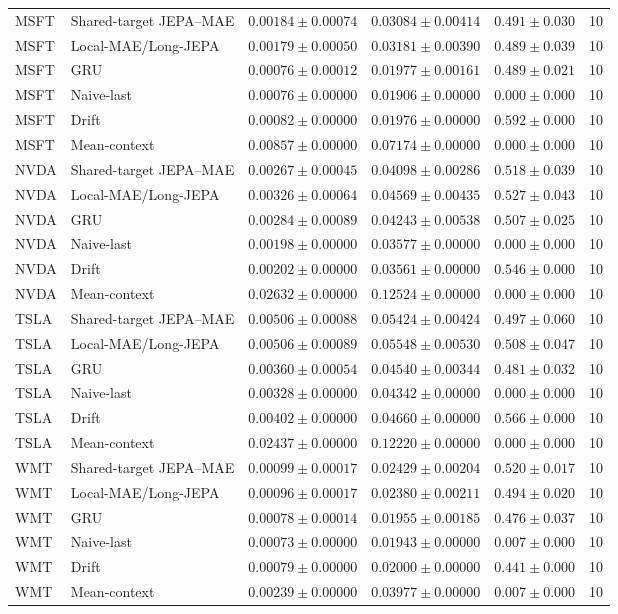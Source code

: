 \begin{longtable}{llrrrr}
MSFT & Shared-target JEPA--MAE & $0.00184 \pm 0.00074$ & $0.03084 \pm 0.00414$ & $0.491 \pm 0.030$ & 10 \\
MSFT & Local-MAE/Long-JEPA & $0.00179 \pm 0.00050$ & $0.03181 \pm 0.00390$ & $0.489 \pm 0.039$ & 10 \\
MSFT & GRU & $0.00076 \pm 0.00012$ & $0.01977 \pm 0.00161$ & $0.489 \pm 0.021$ & 10 \\
MSFT & Naive-last & $0.00076 \pm 0.00000$ & $0.01906 \pm 0.00000$ & $0.000 \pm 0.000$ & 10 \\
MSFT & Drift & $0.00082 \pm 0.00000$ & $0.01976 \pm 0.00000$ & $0.592 \pm 0.000$ & 10 \\
MSFT & Mean-context & $0.00857 \pm 0.00000$ & $0.07174 \pm 0.00000$ & $0.000 \pm 0.000$ & 10 \\
NVDA & Shared-target JEPA--MAE & $0.00267 \pm 0.00045$ & $0.04098 \pm 0.00286$ & $0.518 \pm 0.039$ & 10 \\
NVDA & Local-MAE/Long-JEPA & $0.00326 \pm 0.00064$ & $0.04569 \pm 0.00435$ & $0.527 \pm 0.043$ & 10 \\
NVDA & GRU & $0.00284 \pm 0.00089$ & $0.04243 \pm 0.00538$ & $0.507 \pm 0.025$ & 10 \\
NVDA & Naive-last & $0.00198 \pm 0.00000$ & $0.03577 \pm 0.00000$ & $0.000 \pm 0.000$ & 10 \\
NVDA & Drift & $0.00202 \pm 0.00000$ & $0.03561 \pm 0.00000$ & $0.546 \pm 0.000$ & 10 \\
NVDA & Mean-context & $0.02632 \pm 0.00000$ & $0.12524 \pm 0.00000$ & $0.000 \pm 0.000$ & 10 \\
TSLA & Shared-target JEPA--MAE & $0.00506 \pm 0.00088$ & $0.05424 \pm 0.00424$ & $0.497 \pm 0.060$ & 10 \\
TSLA & Local-MAE/Long-JEPA & $0.00506 \pm 0.00089$ & $0.05548 \pm 0.00530$ & $0.508 \pm 0.047$ & 10 \\
TSLA & GRU & $0.00360 \pm 0.00054$ & $0.04540 \pm 0.00344$ & $0.481 \pm 0.032$ & 10 \\
TSLA & Naive-last & $0.00328 \pm 0.00000$ & $0.04342 \pm 0.00000$ & $0.000 \pm 0.000$ & 10 \\
TSLA & Drift & $0.00402 \pm 0.00000$ & $0.04660 \pm 0.00000$ & $0.566 \pm 0.000$ & 10 \\
TSLA & Mean-context & $0.02437 \pm 0.00000$ & $0.12220 \pm 0.00000$ & $0.000 \pm 0.000$ & 10 \\
WMT & Shared-target JEPA--MAE & $0.00099 \pm 0.00017$ & $0.02429 \pm 0.00204$ & $0.520 \pm 0.017$ & 10 \\
WMT & Local-MAE/Long-JEPA & $0.00096 \pm 0.00017$ & $0.02380 \pm 0.00211$ & $0.494 \pm 0.020$ & 10 \\
WMT & GRU & $0.00078 \pm 0.00014$ & $0.01955 \pm 0.00185$ & $0.476 \pm 0.037$ & 10 \\
WMT & Naive-last & $0.00073 \pm 0.00000$ & $0.01943 \pm 0.00000$ & $0.007 \pm 0.000$ & 10 \\
WMT & Drift & $0.00079 \pm 0.00000$ & $0.02000 \pm 0.00000$ & $0.441 \pm 0.000$ & 10 \\
WMT & Mean-context & $0.00239 \pm 0.00000$ & $0.03977 \pm 0.00000$ & $0.007 \pm 0.000$ & 10 \\
\bottomrule
\end{longtable}

